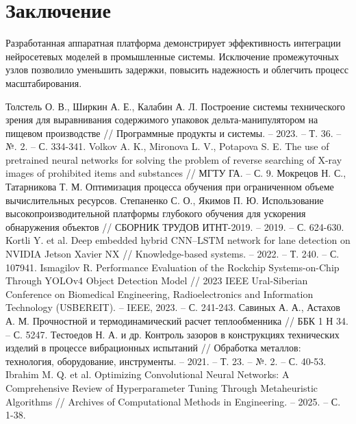 \documentclass[16pt]{article}
\begin{document}
\section{Заключение}
Разработанная аппаратная платформа демонстрирует эффективность интеграции нейросетевых моделей в промышленные системы. Исключение промежуточных узлов позволило уменьшить задержки, повысить надежность и облегчить процесс масштабирования.

\newpage
\begin{thebibliography}{9}
 Толстель О. В., Ширкин А. Е., Калабин А. Л. Построение системы технического зрения для выравнивания содержимого упаковок дельта-манипулятором на пищевом производстве // Программные продукты и системы. – 2023. – Т. 36. – №. 2. – С. 334-341.
 Volkov A. K., Mironova L. V., Potapova S. E. The use of pretrained neural networks for solving the problem of reverse searching of X-ray images of prohibited items and substances // МГТУ ГА. – С. 9.
 Мокрецов Н. С., Татарникова Т. М. Оптимизация процесса обучения при ограниченном объеме вычислительных ресурсов.
 Степаненко С. О., Якимов П. Ю. Использование высокопроизводительной платформы глубокого обучения для ускорения обнаружения объектов // СБОРНИК ТРУДОВ ИТНТ-2019. – 2019. – С. 624-630.
 Kortli Y. et al. Deep embedded hybrid CNN–LSTM network for lane detection on NVIDIA Jetson Xavier NX // Knowledge-based systems. – 2022. – Т. 240. – С. 107941.
 Ismagilov R. Performance Evaluation of the Rockchip Systems-on-Chip Through YOLOv4 Object Detection Model // 2023 IEEE Ural-Siberian Conference on Biomedical Engineering, Radioelectronics and Information Technology (USBEREIT). – IEEE, 2023. – С. 241-243.
 Савиных А. А., Астахов А. М. Прочностной и термодинамический расчет теплообменника // ББК 1 Н 34. – С. 5247.
 Тестоедов Н. А. и др. Контроль зазоров в конструкциях технических изделий в процессе вибрационных испытаний // Обработка металлов: технология, оборудование, инструменты. – 2021. – Т. 23. – №. 2. – С. 40-53.
 Ibrahim M. Q. et al. Optimizing Convolutional Neural Networks: A Comprehensive Review of Hyperparameter Tuning Through Metaheuristic Algorithms // Archives of Computational Methods in Engineering. – 2025. – С. 1-38.
\end{thebibliography}
\end{document}
